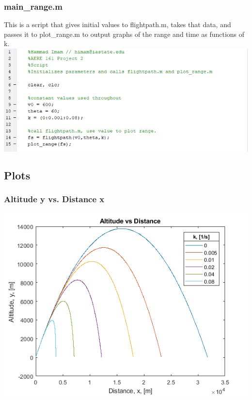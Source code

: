 \documentclass[oneside]{article}
\begin{document}
\subsubsection{main\_range.m}
This is a script that gives initial values to flightpath.m, takes that data, and passes it to plot\_range.m to output graphs of the range and time as functions of k.\\
\includegraphics [width=\linewidth*4/5]{code_main_range.png}
\newpage
\subsection{Plots}
\subsubsection{Altitude y vs. Distance x}
\includegraphics [width=\linewidth*4/5]{graph_y-x.png}
\end{document}
